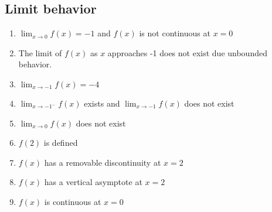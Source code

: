 \documentclass[12pt
]{article}
\begin{document}
\subsection{Limit behavior}
\begin{enumerate}
\def\labelenumi{\arabic{enumi}.}
\item  \(\displaystyle \lim _{x \rightarrow 0} f(x)=-1\) and \(f(x)\) is
not continuous at \(x=0\) 
\item  The limit of \(f(x)\) as \(x\) approaches
-1 does not exist due unbounded behavior.
\item  \(\displaystyle \lim _{x \rightarrow-1} f(x)=-4\) \item  \(\displaystyle \lim _{x \rightarrow-1^-} f(x)\) exists and
\(\displaystyle \lim _{x \rightarrow-1} f(x)\) does not exist 
\item  \(\displaystyle \lim_{x \to 0} f(x)\) does not exist 
\item  \(f(2)\) is defined 
\item  \(f(x)\) has a removable discontinuity at \(x=2\) 
\item  \(f(x)\) has a vertical asymptote at \(x=2\) 
\item  \(f(x)\) is continuous at \(x=0\)
\end{enumerate}
\end{document}
